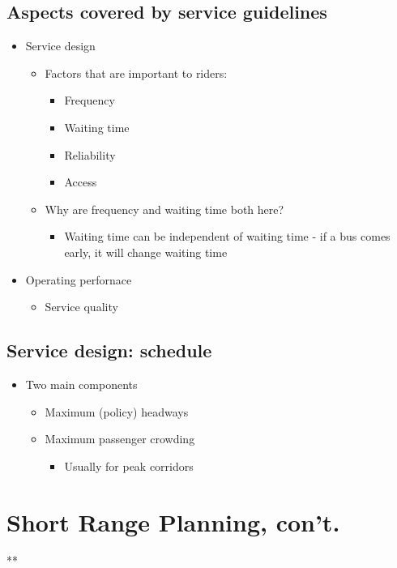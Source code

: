 \documentclass[11pt]{article}
\begin{document}
\subsection{Aspects covered by service guidelines}
\label{sec:org2c6cbfa}
\begin{itemize}
\item Service design
\begin{itemize}
\item Factors that are important to riders:
\begin{itemize}
\item Frequency
\item Waiting time
\item Reliability
\item Access
\end{itemize}
\item Why are frequency and waiting time both here?
\begin{itemize}
\item Waiting time can be independent of waiting time - if a bus comes early, it will change waiting time
\end{itemize}
\end{itemize}
\item Operating perfornace
\begin{itemize}
\item Service quality
\end{itemize}
\end{itemize}

\subsection{Service design: schedule}
\label{sec:org944849c}
\begin{itemize}
\item Two main components
\begin{itemize}
\item Maximum (policy) headways
\item Maximum passenger crowding
\begin{itemize}
\item Usually for peak corridors
\end{itemize}
\end{itemize}
\end{itemize}

\section{Short Range Planning, con't.}
\label{sec:orge1ebef6}

**
\end{document}
